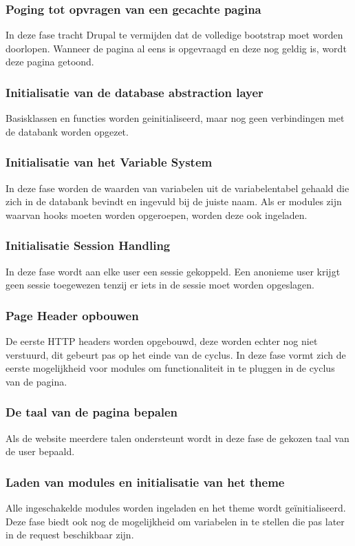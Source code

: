 \subsubsection{Poging tot opvragen van een gecachte pagina}
In deze fase tracht Drupal te vermijden dat de volledige bootstrap moet worden doorlopen. Wanneer de pagina al eens is opgevraagd en deze nog geldig is, wordt deze pagina getoond.

\subsubsection{Initialisatie van de database abstraction layer}
Basisklassen en functies worden geinitialiseerd, maar nog geen verbindingen met de databank worden opgezet.

\subsubsection{Initialisatie van het Variable System}
In deze fase worden de waarden van variabelen uit de variabelentabel gehaald die zich in de databank bevindt en ingevuld bij de juiste naam. Als er modules zijn waarvan hooks moeten worden opgeroepen, worden deze ook ingeladen.

\subsubsection{Initialisatie Session Handling}
In deze fase wordt aan elke user een sessie gekoppeld. Een anonieme user krijgt geen sessie toegewezen tenzij er iets in de sessie moet worden opgeslagen.

\subsubsection{Page Header opbouwen}
De eerste HTTP headers worden opgebouwd, deze worden echter nog niet verstuurd, dit gebeurt pas op het einde van de cyclus. In deze fase vormt zich de eerste mogelijkheid voor modules om functionaliteit in te pluggen in de cyclus van de pagina.

\subsubsection{De taal van de pagina bepalen}
Als de website meerdere talen ondersteunt wordt in deze fase de gekozen taal van de user bepaald.

\subsubsection{Laden van modules en initialisatie van het theme}
Alle ingeschakelde modules worden ingeladen en het theme wordt ge\"{i}nitialiseerd. Deze fase biedt ook nog de mogelijkheid om variabelen in te stellen die pas later in de request beschikbaar zijn.


